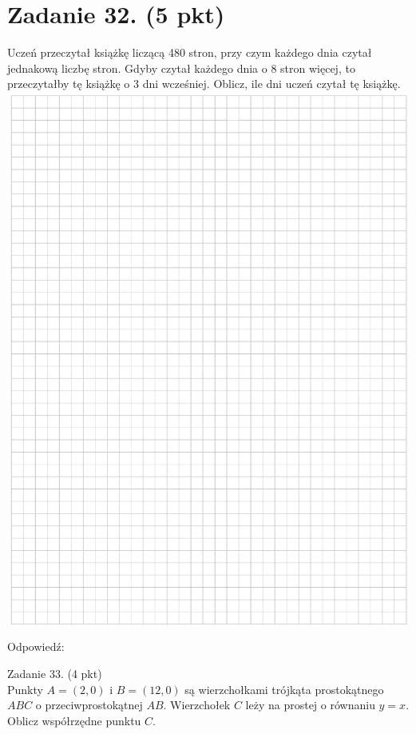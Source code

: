\documentclass[10pt]{article}
\begin{document}
\section*{Zadanie 32. (5 pkt)}
Uczeń przeczytał książkę liczącą 480 stron, przy czym każdego dnia czytał jednakową liczbę stron. Gdyby czytał każdego dnia o 8 stron więcej, to przeczytałby tę książkę o 3 dni wcześniej. Oblicz, ile dni uczeń czytał tę książkę.\\
\includegraphics[max width=\textwidth, center]{2024_11_21_ad52a81220b9b2239458g-14}

Odpowiedź:

Zadanie 33. (4 pkt)\\
Punkty \(A=(2,0)\) i \(B=(12,0)\) są wierzchołkami trójkąta prostokątnego \(A B C\) o przeciwprostokątnej \(A B\). Wierzchołek \(C\) leży na prostej o równaniu \(y=x\). Oblicz współrzędne punktu \(C\).
\end{document}
